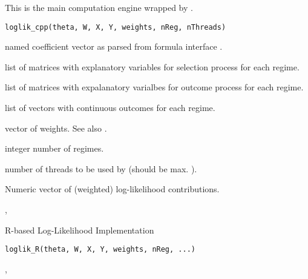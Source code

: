 %
\begin{Description}
This is the main computation engine wrapped by .
\end{Description}
%
\begin{Usage}
\begin{verbatim}
loglik_cpp(theta, W, X, Y, weights, nReg, nThreads)
\end{verbatim}
\end{Usage}
%
\begin{Arguments}
\begin{ldescription}
\item[\code{theta}] named coefficient vector as parsed from formula interface .

\item[\code{W}] list of matrices with explanatory variables for selection process for each regime.

\item[\code{X}] list of matrices with expalanatory varialbes for outcome process for each regime.

\item[\code{Y}] list of vectors with continuous outcomes for each regime.

\item[\code{weights}] vector of weights. See also .

\item[\code{nReg}] integer number of regimes.

\item[\code{nThreads}] number of threads to be used by  (should be max. ).
\end{ldescription}
\end{Arguments}
%
\begin{Value}
Numeric vector of (weighted) log-likelihood contributions.
\end{Value}
%
\begin{SeeAlso}
, 
\end{SeeAlso}


%
\begin{Description}
R-based Log-Likelihood Implementation
\end{Description}
%
\begin{Usage}
\begin{verbatim}
loglik_R(theta, W, X, Y, weights, nReg, ...)
\end{verbatim}
\end{Usage}
%
\begin{SeeAlso}
, 
\end{SeeAlso}

